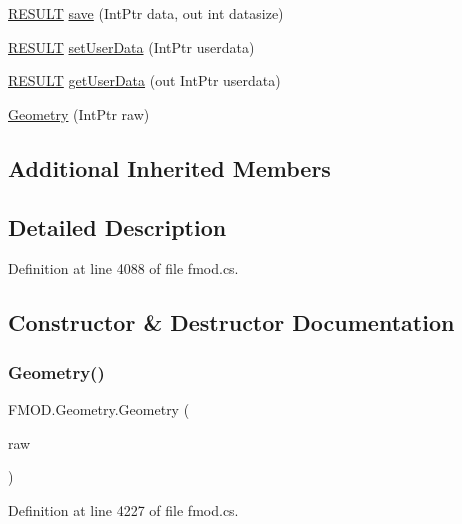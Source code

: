 \begin{DoxyCompactItemize}
\hyperlink{namespace_f_m_o_d_a305d1176ef3f8c8815861a60407ac33d}{R\+E\+S\+U\+LT} \hyperlink{class_f_m_o_d_1_1_geometry_ab1c1659f4c3183ec0238ad2ce1bdcc12}{save} (Int\+Ptr data, out int datasize)
\item 
\hyperlink{namespace_f_m_o_d_a305d1176ef3f8c8815861a60407ac33d}{R\+E\+S\+U\+LT} \hyperlink{class_f_m_o_d_1_1_geometry_ad8119f19c0d90e9b18685881b9362585}{set\+User\+Data} (Int\+Ptr userdata)
\item 
\hyperlink{namespace_f_m_o_d_a305d1176ef3f8c8815861a60407ac33d}{R\+E\+S\+U\+LT} \hyperlink{class_f_m_o_d_1_1_geometry_a988a68c2633336b5ee8a6654e11a1c8e}{get\+User\+Data} (out Int\+Ptr userdata)
\item 
\hyperlink{class_f_m_o_d_1_1_geometry_a7bc5cf69a7b4debd67d52d891c604b3d}{Geometry} (Int\+Ptr raw)
\end{DoxyCompactItemize}
\subsection*{Additional Inherited Members}


\subsection{Detailed Description}


Definition at line 4088 of file fmod.\+cs.



\subsection{Constructor \& Destructor Documentation}
\mbox{\label{class_f_m_o_d_1_1_geometry_a7bc5cf69a7b4debd67d52d891c604b3d}} 
\subsubsection{\texorpdfstring{Geometry()}{Geometry()}}
{\footnotesize\ttfamily F\+M\+O\+D.\+Geometry.\+Geometry (\begin{DoxyParamCaption}\item[{Int\+Ptr}]{raw }\end{DoxyParamCaption})}



Definition at line 4227 of file fmod.\+cs.




